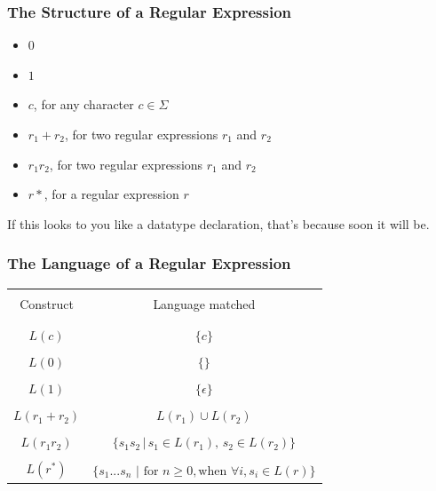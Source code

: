 \documentclass[aspectratio=169]{beamer}
\begin{document}
\begin{frame}[fragile]
  \frametitle{The Structure of a Regular Expression}


  \pause
  \begin{itemize}
    \item $0$
    \item $1$ \pause
    \item $c$, for any character $c \in \Sigma$ \pause
    \item $r_1 + r_2$, for two regular expressions $r_1$ and $r_2$
    \item $r_1r_2$, for two regular expressions $r_1$ and $r_2$
    \item $r*$, for a regular expression $r$
  \end{itemize}

  \pause
  \vspace{\fill}

  If this looks to you like a datatype declaration, that's because soon
  it will be.
\end{frame}

\begin{frame}[fragile]
  \frametitle{The Language of a Regular Expression}


  \pause
  \begin{center}
    \begin{tabular}{c || c}
      \hline & \\[-1.5ex]
      Construct & Language matched \\ [2pt]
      \hline & \\[-2ex]
      \hline & \\[-1.5ex]
      $L(c)$ & $\{ c \}$ \\ [2pt]
      \hline & \\[-1.5ex]
      $L(0)$ & $\{ \}$ \\ [2pt]
      \hline & \\[-1.5ex]
      $L(1)$ & $\{ \epsilon \}$ \\ [2pt]
      \hline & \\[-1.5ex]
      $L(r_1 + r_2)$ & $L(r_1) \cup L(r_2)$ \\ [2pt]
      \hline & \\[-1.5ex]
      $L(r_1r_2)$ & $\{ s_1s_2 \, | \, s_1 \in L(r_1),\, s_2 \in L(r_2) \}$ \\ [2pt]
      \hline & \\[-1.5ex]
      $L(r^*)$ & $\{ s_1 ... s_n \,\, | \,\, \text{for } n \geq 0, \text{when } \forall i, s_i \in L(r) \}$ \\ [2pt]
      \hline
    \end{tabular}
  \end{center}
\end{frame}
\end{document}
